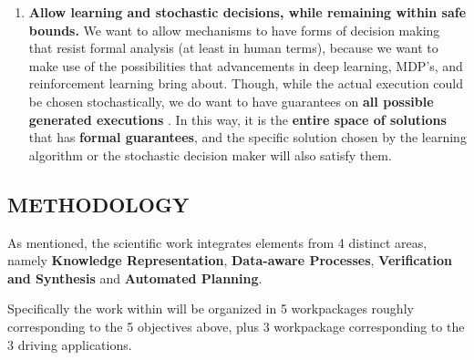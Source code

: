 \begin{enumerate}
\item 
\textbf{Allow learning and stochastic decisions, while remaining within safe bounds.}
We want to allow mechanisms to have forms of decision making that
resist formal analysis (at least in human terms), because we want to
make use of the possibilities that advancements in deep learning,
MDP's, and reinforcement learning bring about. Though, while the actual
execution could be chosen stochastically, we do want to have
guarantees on \textbf{all possible generated executions}  \cite{ML1,ML2,ML3}.  In this
way, it is the \textbf{entire space of solutions} that has
\textbf{formal guarantees}, and the specific solution chosen by the
learning algorithm or the stochastic decision maker will also satisfy
them. %



\end{enumerate}




\subsection*{METHODOLOGY}

As mentioned, the scientific work integrates elements from 4 distinct areas, namely 
\textbf{Knowledge Representation}, \textbf{Data-aware Processes},
\textbf{Verification and Synthesis } and \textbf{Automated Planning}.

Specifically the work within \project will be organized in 5 workpackages roughly
corresponding to the 5 objectives above, plus 3 workpackage corresponding to
the 3 driving applications. 

